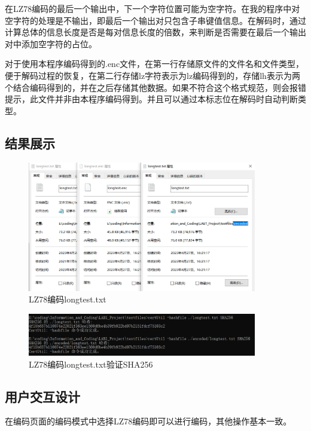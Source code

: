 \documentclass[12pt, a4paper]{ctexart}
\begin{document}
    在LZ78编码的最后一个输出中，下一个字符位置可能为空字符。在我的程序中对空字符的处理是不输出，即最后一个输出对只包含子串键值信息。在解码时，通过计算总体的信息长度是否是每对信息长度的倍数，来判断是否需要在最后一个输出对中添加空字符的占位。

    对于使用本程序编码得到的.enc文件，在第一行存储原文件的文件名和文件类型，便于解码过程的恢复，在第二行存储lz字符表示为lz编码得到的，存储lh表示为两个结合编码得到的，并在之后存储其他数据。如果不符合这个格式规范，则会报错提示，此文件并非由本程序编码得到。并且可以通过本标志位在解码时自动判断类型。

    \subsection{结果展示}
    \begin{figure}[H]
    \centering
    \includegraphics[width=10cm]{./pic/5-1.png}		
    \caption{LZ78编码longtest.txt}
    \end{figure}
    \begin{figure}[H]
    \centering
    \includegraphics[width=10cm]{./pic/5-2.png}		
    \caption{LZ78编码longtest.txt验证SHA256}
    \end{figure}

    \subsection{用户交互设计}

    在编码页面的编码模式中选择LZ78编码即可以进行编码，其他操作基本一致。
    
\end{document}
